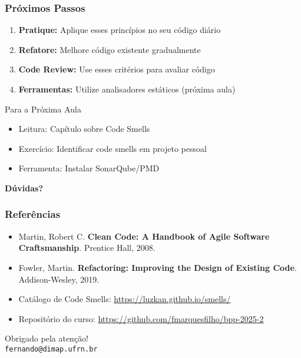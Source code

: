 \documentclass[aspectratio=169]{beamer}
\begin{document}
\begin{frame}
\frametitle{Próximos Passos}

\begin{enumerate}
    \item \textbf{Pratique:} Aplique esses princípios no seu código diário
    \item \textbf{Refatore:} Melhore código existente gradualmente
    \item \textbf{Code Review:} Use esses critérios para avaliar código
    \item \textbf{Ferramentas:} Utilize analisadores estáticos (próxima aula)
\end{enumerate}

\vspace{0.5cm}
\begin{block}{Para a Próxima Aula}
\begin{itemize}
    \item Leitura: Capítulo sobre Code Smells
    \item Exercício: Identificar code smells em projeto pessoal
    \item Ferramenta: Instalar SonarQube/PMD
\end{itemize}
\end{block}

\vspace{0.5cm}
\begin{center}
\textbf{Dúvidas?}
\end{center}
\end{frame}

\begin{frame}
\frametitle{Referências}

\begin{itemize}
    \item Martin, Robert C. \textbf{Clean Code: A Handbook of Agile Software Craftsmanship}. Prentice Hall, 2008.
    \item Fowler, Martin. \textbf{Refactoring: Improving the Design of Existing Code}. Addison-Wesley, 2019.
    \item Catálogo de Code Smells: \url{https://luzkan.github.io/smells/}
    \item Repositório do curso: \url{https://github.com/fmarquesfilho/bpp-2025-2}
\end{itemize}

\vspace{1cm}
\begin{center}
\Large
Obrigado pela atenção!\\
\vspace{0.5cm}
\normalsize
\texttt{fernando@dimap.ufrn.br}
\end{center}
\end{frame}
\end{document}
